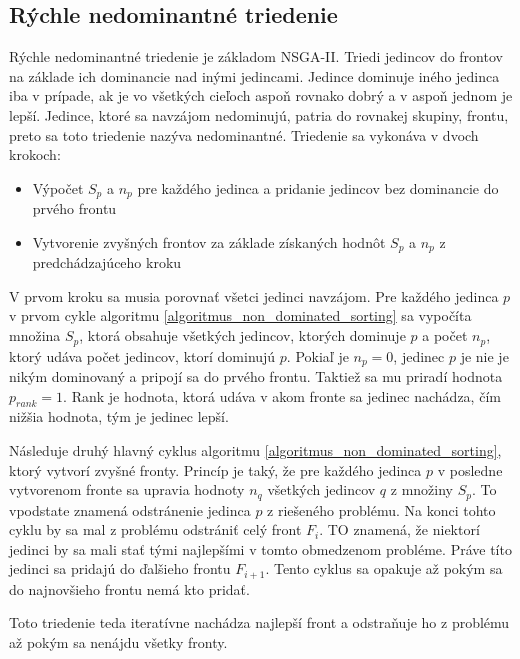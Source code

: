 \subsection*{Rýchle nedominantné triedenie}
Rýchle nedominantné triedenie je základom NSGA-II.
Triedi jedincov do frontov na základe ich dominancie nad inými jedincami.
Jedince dominuje iného jedinca iba v prípade, ak je vo všetkých cieľoch aspoň rovnako dobrý a v aspoň jednom je lepší.
Jedince, ktoré sa navzájom nedominujú, patria do rovnakej skupiny, frontu, preto sa toto triedenie nazýva nedominantné.
Triedenie sa vykonáva v dvoch krokoch:
\begin{itemize}
  \item Výpočet $S_p$ a $n_p$ pre každého jedinca a pridanie jedincov bez dominancie do prvého frontu
  \item Vytvorenie zvyšných frontov za základe získaných hodnôt $S_p$ a $n_p$ z predchádzajúceho kroku
\end{itemize}
V prvom kroku sa musia porovnať všetci jedinci navzájom.
Pre každého jedinca $p$ v prvom cykle algoritmu \ref{algoritmus_non_dominated_sorting} sa vypočíta množina $S_p$, ktorá obsahuje všetkých jedincov, ktorých dominuje $p$ a počet $n_p$, ktorý udáva počet jedincov, ktorí dominujú $p$.
Pokiaľ je $n_p = 0$, jedinec $p$ je nie je nikým dominovaný a pripojí sa do prvého frontu.
Taktiež sa mu priradí hodnota $p_{rank} = 1$.
Rank je hodnota, ktorá udáva v akom fronte sa jedinec nachádza, čím nižšia hodnota, tým je jedinec lepší.

Následuje druhý hlavný cyklus algoritmu \ref{algoritmus_non_dominated_sorting}, ktorý vytvorí zvyšné fronty.
Princíp je taký, že pre každého jedinca $p$ v posledne vytvorenom fronte sa upravia hodnoty $n_q$ všetkých jedincov $q$ z množiny $S_p$.
To vpodstate znamená odstránenie jedinca $p$ z riešeného problému.
Na konci tohto cyklu by sa mal z problému odstrániť celý front $F_i$.
TO znamená, že niektorí jedinci by sa mali stať tými najlepšími v tomto obmedzenom probléme.
Práve títo jedinci sa pridajú do ďalšieho frontu $F_{i+1}$.
Tento cyklus sa opakuje až pokým sa do najnovšieho frontu nemá kto pridať.

Toto triedenie teda iteratívne nachádza najlepší front a odstraňuje ho z problému až pokým sa nenájdu všetky fronty.

